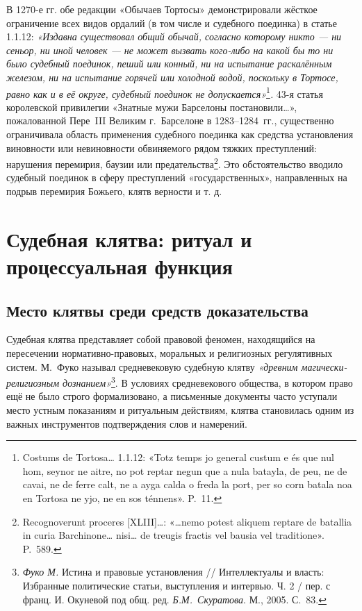 В 1270-е гг. обе редакции «Обычаев Тортосы» демонстрировали жёсткое ограничение всех видов ордалий (в том числе и судебного поединка) в статье 1.1.12: \emph{«Издавна существовал общий обычай, согласно которому никто --- ни сеньор, ни иной человек --- не может вызвать кого-либо на какой бы то ни было судебный поединок, пеший или конный, ни на испытание раскалённым железом, ни на испытание горячей или холодной водой, поскольку в Тортосе, равно как и в её округе, судебный поединок не допускается»}\footnote{Costums de Tortosa… 1.1.12: «Totz temps jo general custum e és que nul hom, seynor ne aitre, no pot reptar negun que a nula batayla, de peu, ne de cavai, ne de ferre calt, ne a ayga calda o freda la port, per so corn batala noa en Tortosa ne yjo, ne en sos ténnens». P.~11.}\emph{. }43-я статья королевской привилегии «Знатные мужи Барселоны постановили…», пожалованной Пере~III Великим г.~Барселоне в 1283--1284~гг., существенно ограничивала область применения судебного поединка как средства установления виновности или невиновности обвиняемого рядом тяжких преступлений: нарушения перемирия, баузии или предательства\footnote{Recognoverunt proceres [XLIII]…: «…nemo potest aliquem reptare de batallia in curia Barchinone… nisi… de treugis fractis vel bausia vel traditione». P.~589.}. Это обстоятельство вводило судебный поединок в сферу преступлений «государственных», направленных на подрыв перемирия Божьего, клятв верности и т. д.

\section{Судебная клятва: ритуал и процессуальная функция}

\subsection{Место клятвы среди средств доказательства}

Судебная клятва представляет собой правовой феномен, находящийся на пересечении нормативно-правовых, моральных и религиозных регулятивных систем. М.~Фуко называл средневековую судебную клятву \emph{«древним магически-религиозным дознанием»}\footnote{\emph{Фуко М. }Истина и правовые установления // Интеллектуалы и власть: Избранные политические статьи, выступления и интервью. Ч. 2 / пер. с франц. И. Окуневой под общ. ред. \emph{Б.М.~Скуратова}. М., 2005. С.~83.}. В условиях средневекового общества, в котором право ещё не было строго формализовано, а письменные документы часто уступали место устным показаниям и ритуальным действиям, клятва становилась одним из важных инструментов подтверждения слов и намерений.

